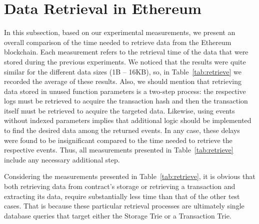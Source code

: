 \section{Data Retrieval in Ethereum}\label{sec:evaluation_ethereum_retrieval}
In this subsection, based on our experimental measurements, we present an overall comparison of the time needed to retrieve data from the Ethereum blockchain. Each measurement refers to the retrieval time of the data that were stored during the previous experiments. We noticed that the results were quite similar for the different data sizes (1B – 16KB), so, in Table~\ref{tab:retrieve} we recorded the average of these results. Also, we should mention that retrieving data stored in unused function parameters is a two-step process: the respective logs must be retrieved to acquire the transaction hash and then the transaction itself must be retrieved to acquire the targeted data. Likewise, using events without indexed parameters implies that additional logic should be implemented to find the desired data among the returned events. In any case, these delays were found to be insignificant compared to the time needed to retrieve the respective events. Thus, all measurements presented in Table~\ref{tab:retrieve} include any necessary additional step.

Considering the measurements presented in Table~\ref{tab:retrieve}, it is obvious that both retrieving data from contract’s storage or retrieving a transaction and extracting its data, require substantially less time than that of the other test cases. That is because these particular retrieval processes are ultimately single database queries that target either the Storage Trie or a Transaction Trie. 

\begin{table}[]
\caption{Retrieval latency in Ethereum (ms)}
\label{tab:retrieve}
\centering
{}
\end{table}

